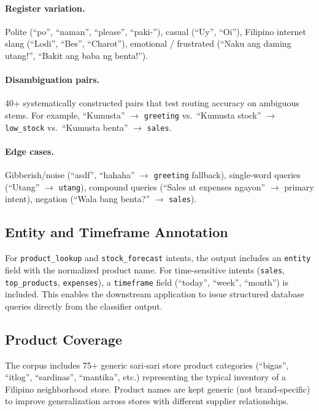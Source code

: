\documentclass[11pt,a4paper]{article}
\begin{document}
\paragraph{Register variation.}
Polite (``po'', ``naman'', ``please'', ``paki-''), casual (``Uy'', ``Oi''),
Filipino internet slang (``Lodi'', ``Bes'', ``Charot''), emotional / frustrated
(``Naku ang daming utang!'', ``Bakit ang baba ng benta!'').

\paragraph{Disambiguation pairs.}
40+ systematically constructed pairs that test routing accuracy on ambiguous
stems. For example, ``Kumusta'' $\to$ \texttt{greeting} vs.\
``Kumusta stock'' $\to$ \texttt{low\_stock} vs.\
``Kumusta benta'' $\to$ \texttt{sales}.

\paragraph{Edge cases.}
Gibberish/noise (``asdf'', ``hahaha'' $\to$ \texttt{greeting} fallback),
single-word queries (``Utang'' $\to$ \texttt{utang}),
compound queries (``Sales at expenses ngayon'' $\to$ primary intent),
negation (``Wala bang benta?'' $\to$ \texttt{sales}).

\subsection{Entity and Timeframe Annotation}

For \texttt{product\_lookup} and \texttt{stock\_forecast} intents, the output
includes an \texttt{entity} field with the normalized product name. For
time-sensitive intents (\texttt{sales}, \texttt{top\_products},
\texttt{expenses}), a \texttt{timeframe} field (``today'', ``week'',
``month'') is included. This enables the downstream application to issue
structured database queries directly from the classifier output.

\subsection{Product Coverage}

The corpus includes 75+ generic sari-sari store product categories (``bigas'',
``itlog'', ``sardinas'', ``mantika'', etc.) representing the typical inventory
of a Filipino neighborhood store. Product names are kept generic (not
brand-specific) to improve generalization across stores with different
supplier relationships.
\end{document}

